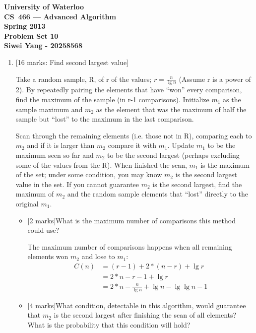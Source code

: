 \documentclass[12pt]{article}
\begin{document}
\begin{center}
\large\bf University of Waterloo\\
CS~466 --- Advanced Algorithm\\
Spring 2013\\
Problem Set 10\\
Siwei Yang - 20258568\\
\end{center}
\bigskip

\begin{enumerate}

\item{} [16 marks: Find second largest value]

Take a random sample, R, of r of the values; $r = \frac{n}{\lg n}$ (Assume r is a power of 2). By repeatedly pairing the elements that have “won” every comparison, find the maximum of the sample (in r-1 comparisons). Initialize $m_{1}$ as the sample maximum and $m_{2}$ as the element that was the maximum of half the sample but “lost” to the maximum in the last comparison.

Scan through the remaining elements (i.e. those not in R), comparing each to $m_{2}$ and if it is larger than $m_{2}$ compare it with $m_{1}$. Update $m_{1}$ to be the maximum seen so far and $m_{2}$ to be the second largest (perhaps excluding some of the values from the R). When finished the scan, $m_{1}$ is the maximum of the set; under some condition, you may know $m_{2}$ is the second largest value in the set. If you cannot guarantee $m_{2}$ is the second largest, find the maximum of $m_{2}$ and the random sample elements that “lost” directly to the original $m_{1}$.

\begin{itemize}
\item{}[2 marks]What is the maximum number of comparisons this method could use?

The maximum number of comparisons happens when all remaining elements won $m_{2}$ and lose to $m_{1}$:
\begin{align*}
C(n) &= (r - 1) + 2 * (n - r) + \lg r
\\ &= 2 * n - r - 1 + \lg r
\\ &= 2 * n - \frac{n}{\lg n} + \lg n - \lg \lg n - 1
\end{align*}

\item{}[4 marks]What condition, detectable in this algorithm, would guarantee that $m_{2}$ is the second largest after finishing the scan of all elements? What is the probability that this condition will hold?


\end{itemize}
\end{enumerate}
\end{document}
